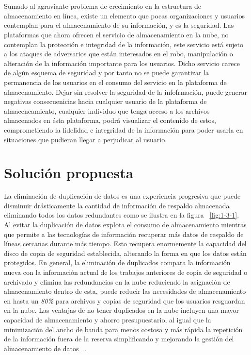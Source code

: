 \\ \\ 
Sumado al agraviante problema de crecimiento en la estructura de almacenamiento en línea, existe un elemento que pocas organizaciones y usuarios contemplan para el almacenamiento de su información, y es la seguridad. Las plataformas que ahora ofrecen el servicio de almacenamiento en la nube, no contemplan la protección e integridad de la información, este servicio está sujeto a los ataques de adversarios que están interesados en el robo, manipulación o alteración de la información importante para los usuarios. Dicho servicio carece de algún esquema de seguridad y por tanto no se puede garantizar la permanencia de los usuarios en el consumo del servicio en la plataforma de almacenamiento. 
Dejar sin resolver la seguridad de la infofrmación, puede generar negativas consecuenicias hacia cualquier usuario de la plataforma de almacencamiento, cualquier individuo que tenga acceso a los archivos almacenados en ésta plataforma, podrá visualizar el contenido de estos, comprometiendo la fidelidad e integridad de la información para poder usarla en situaciones que pudieran llegar a perjudicar al usuario. 
\\

\section{Solución propuesta}
La eliminación de duplicación de datos es una experiencia progresiva que puede disminuir drásticamente la cantidad de información de respaldo almacenada eliminando todos los datos redundantes como se ilustra en la figura ~\ref{fig:1-3-1}. Al evitar la duplicación de datos explota el consumo de almacenamiento mientras que permite a las tecnologías de información recuperar más datos de respaldo de líneas cercanas durante más tiempo. Esto recupera enormemente la capacidad del disco de copia de seguridad establecida, alterando la forma en que los datos están protegidos. En general,
la eliminación de duplicados compara la información nueva con la información actual de los trabajos anteriores de copia de seguridad o archivado y elimina las redundancias en la nube reduciendo la asignación de almacenamiento dentro de esta, puede reducir las necesidades de almacenamiento en hasta un \textit{80\%} para archivos y copias de seguridad que los usuarios resguardan en la nube. Las ventajas de no tener duplicados en la nube incluyen una mayor capacidad de almacenamiento y ahorro presupuestario, al igual que la minimización del ancho de banda para menos costosa y más rápida la repetición de la información fuera de la reserva simplificando y mejorando la gestión del almacenamiento de datos  ~\cite{rededup}. 


